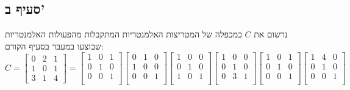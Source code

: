 \documentclass[a4paper, 10pt]{article}
\begin{document}
\begin{hebrew}
	\subsection{סעיף ב'}
	נרשום את $C$ כמכפלה של המטריצות האלמנטריות המתקבלות מהפעולות
	האלמנטריות שבוצעו במעבר בסעיף הקודם:
	\[
		C = 
		\begin{bmatrix}
			0 & 2 & 1 \\
			1 & 0 & 1 \\
			3 & 1 & 4
		\end{bmatrix}
		=
		\begin{bmatrix}
			1 & 0 & 1 \\
			0 & 1 & 0 \\
			0 & 0 & 1 \\
		\end{bmatrix}
		\begin{bmatrix}
			0 & 1 & 0 \\
			1 & 0 & 0 \\
			0 & 0 & 1 \\
		\end{bmatrix}
		\begin{bmatrix}
			1 & 0 & 0 \\
			0 & 1 & 0 \\
			1 & 0 & 1 \\
		\end{bmatrix}
		\begin{bmatrix}
			1 & 0 & 0 \\
			0 & 1 & 0 \\
			0 & 3 & 1 \\
		\end{bmatrix}
		\begin{bmatrix}
			1 & 0 & 1 \\
			0 & 1 & 0 \\
			0 & 0 & 1 \\
		\end{bmatrix}
		\begin{bmatrix}
			1 & 4 & 0 \\
			0 & 1 & 0 \\
			0 & 0 & 1 \\
		\end{bmatrix}
	\]

\end{hebrew}
\end{document}
